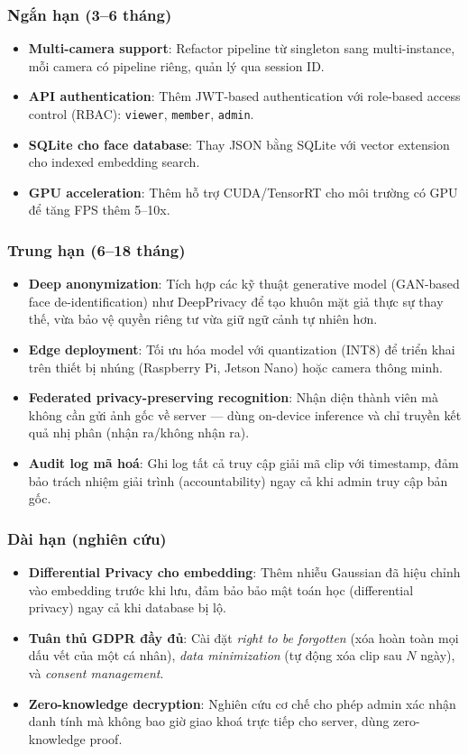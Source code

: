 \subsubsection{Ngắn hạn (3--6 tháng)}
\begin{itemize}
    \item \textbf{Multi-camera support}: Refactor pipeline từ singleton sang multi-instance, mỗi camera có pipeline riêng, quản lý qua session ID.
    \item \textbf{API authentication}: Thêm JWT-based authentication với role-based access control (RBAC): \texttt{viewer}, \texttt{member}, \texttt{admin}.
    \item \textbf{SQLite cho face database}: Thay JSON bằng SQLite với vector extension cho indexed embedding search.
    \item \textbf{GPU acceleration}: Thêm hỗ trợ CUDA/TensorRT cho môi trường có GPU để tăng FPS thêm 5--10x.
\end{itemize}

\subsubsection{Trung hạn (6--18 tháng)}
\begin{itemize}
    \item \textbf{Deep anonymization}: Tích hợp các kỹ thuật generative model (GAN-based face de-identification) như DeepPrivacy \cite{hasler2019deepprivacy} để tạo khuôn mặt giả thực sự thay thế, vừa bảo vệ quyền riêng tư vừa giữ ngữ cảnh tự nhiên hơn.
    \item \textbf{Edge deployment}: Tối ưu hóa model với quantization (INT8) để triển khai trên thiết bị nhúng (Raspberry Pi, Jetson Nano) hoặc camera thông minh.
    \item \textbf{Federated privacy-preserving recognition}: Nhận diện thành viên mà không cần gửi ảnh gốc về server --- dùng on-device inference và chỉ truyền kết quả nhị phân (nhận ra/không nhận ra).
    \item \textbf{Audit log mã hoá}: Ghi log tất cả truy cập giải mã clip với timestamp, đảm bảo trách nhiệm giải trình (accountability) ngay cả khi admin truy cập bản gốc.
\end{itemize}

\subsubsection{Dài hạn (nghiên cứu)}
\begin{itemize}
    \item \textbf{Differential Privacy cho embedding}: Thêm nhiễu Gaussian đã hiệu chỉnh vào embedding trước khi lưu, đảm bảo bảo mật toán học (differential privacy) ngay cả khi database bị lộ.
    \item \textbf{Tuân thủ GDPR đầy đủ}: Cài đặt \textit{right to be forgotten} (xóa hoàn toàn mọi dấu vết của một cá nhân), \textit{data minimization} (tự động xóa clip sau $N$ ngày), và \textit{consent management}.
    \item \textbf{Zero-knowledge decryption}: Nghiên cứu cơ chế cho phép admin xác nhận danh tính mà không bao giờ giao khoá trực tiếp cho server, dùng zero-knowledge proof.
\end{itemize}


